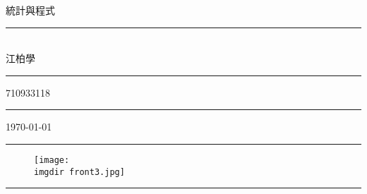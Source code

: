 % 
 
\makeindex 	

\fontsize{36}{30pt}\selectfont
\thispagestyle{empty}
\begin{flushright}
    {\MJH \XeLaTeX 統計與程式}\\
    \rule{3in}{0.2pt}\\
    \medskip\hfill \Large {\sNSM 江柏學}\rule{8mm}{0pt}   
    \medskip \par\vspace*{-2pt}\hfill \small{710933118}\rule{8mm}{0pt} 
    \medskip \par\vspace*{-2pt}\hfill \small\today\rule{8mm}{0pt}
\end{flushright}
\bigskip\bigskip\bigskip\bigskip
\begin{figure}[h]
    
        \texttt{[image: \\imgdir front3.jpg]}%
   \end{figure}
\rule{3in}{0.2pt}\\
 \Large {}
     
    
\fontsize{12}{22pt}\selectfont

\newpage
\cleardoublepage
\setcounter{tocdepth}{2} %

\tableofcontents%
\newpage
\renewcommand{\numberline}[1]{\loflabel~#1\hspace*{1em}}%
\listoffigures %
\newpage
\renewcommand{\numberline}[1]{\lotlabel~#1\hspace*{1em}}%
\listoftables %
\newpage

\ifodd{} \else \thispagestyle{empty}\mbox{}\clearpage\fi %
\setcounter{page}{1} 		%

